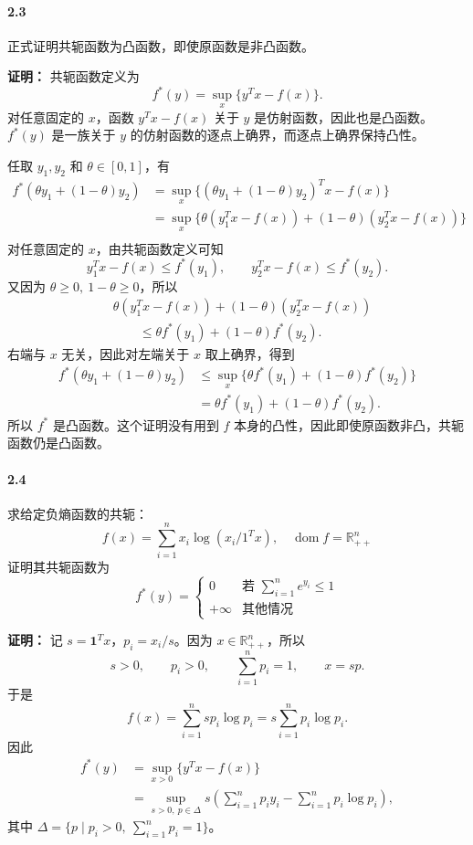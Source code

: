 \documentclass[12pt,a4paper]{article}
\begin{document}
\paragraph{2.3} 正式证明共轭函数为凸函数，即使原函数是非凸函数。

\textbf{证明：}
共轭函数定义为
\[
  f^*(y)=\sup_x\{y^Tx-f(x)\}.
\]
对任意固定的 $x$，函数 $y^Tx-f(x)$ 关于 $y$ 是仿射函数，因此也是凸函数。$f^*(y)$ 是一族关于 $y$ 的仿射函数的逐点上确界，而逐点上确界保持凸性。

任取 $y_1,y_2$ 和 $\theta\in[0,1]$，有
\[
\begin{aligned}
  f^*(\theta y_1+(1-\theta)y_2)
  &=\sup_x\{(\theta y_1+(1-\theta)y_2)^Tx-f(x)\}\\
  &=\sup_x\{\theta(y_1^Tx-f(x))+(1-\theta)(y_2^Tx-f(x))\}\\
\end{aligned}
\]
对任意固定的 $x$，由共轭函数定义可知
\[
  y_1^Tx-f(x)\leq f^*(y_1),\qquad
  y_2^Tx-f(x)\leq f^*(y_2).
\]
又因为 $\theta\geq 0,\ 1-\theta\geq 0$，所以
\[
\begin{aligned}
  &\theta(y_1^Tx-f(x))+(1-\theta)(y_2^Tx-f(x))\\
  &\qquad\leq \theta f^*(y_1)+(1-\theta)f^*(y_2).
\end{aligned}
\]
右端与 $x$ 无关，因此对左端关于 $x$ 取上确界，得到
\[
\begin{aligned}
  f^*(\theta y_1+(1-\theta)y_2)
  &\leq \sup_x\{\theta f^*(y_1)+(1-\theta)f^*(y_2)\}\\
  &=\theta f^*(y_1)+(1-\theta)f^*(y_2).
\end{aligned}
\]
所以 $f^*$ 是凸函数。这个证明没有用到 $f$ 本身的凸性，因此即使原函数非凸，共轭函数仍是凸函数。

\paragraph{2.4} 求给定负熵函数的共轭：
\[
  f(x) = \sum_{i=1}^n x_i \log(x_i / 1^T x), \quad \operatorname{dom} f = \mathbb{R}_{++}^n
\]
证明其共轭函数为
\[
  f^*(y) =
  \begin{cases}
    0 & \text{若 } \sum_{i=1}^n e^{y_i} \leq 1 \\
    +\infty & \text{其他情况}
  \end{cases}
\]

\textbf{证明：}
记 $s=\mathbf{1}^Tx$，$p_i=x_i/s$。因为 $x\in\mathbb{R}_{++}^n$，所以
\[
  s>0,\qquad p_i>0,\qquad \sum_{i=1}^n p_i=1,\qquad x=sp.
\]
于是
\[
  f(x)=\sum_{i=1}^n sp_i\log p_i
  =s\sum_{i=1}^n p_i\log p_i.
\]
因此
\[
\begin{aligned}
  f^*(y)
  &=\sup_{x>0}\{y^Tx-f(x)\}\\
  &=\sup_{s>0,\ p\in\Delta}
    s\left(\sum_{i=1}^n p_i y_i-\sum_{i=1}^n p_i\log p_i\right),
\end{aligned}
\]
其中 $\Delta=\{p\mid p_i>0,\ \sum_{i=1}^n p_i=1\}$。
\end{document}

